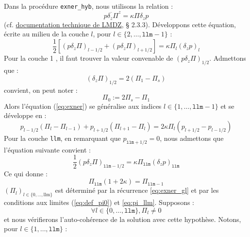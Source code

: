 \documentclass[a4paper,french]{article}
\begin{document}
Dans la procédure \verb+exner_hyb+, nous utilisons la relation :
\begin{displaymath}
  \overline{p \delta_z \Pi}^z = \kappa \Pi \delta_z p
\end{displaymath}
(cf. \href{http://lmdz.lmd.jussieu.fr/utilisateurs/manuel-de-reference-1/developpeurs/notes-techniques/ressources/documentation-du-modele-de-circulation-generale-atmospherique-lmdz}{documentation
  technique de LMDZ}, § 2.3.3). Développons cette équation, écrite au
milieu de la couche $l$, pour $l \in \{2, \dots, \mathtt{llm} - 1\}$ :
\begin{equation}
  \label{eq:exner}
  \frac{1}{2} [(p \delta_z \Pi)_{l-1/2} + (p \delta_z \Pi)_{l+1/2}]
  = \kappa \Pi_l (\delta_z p)_l
\end{equation}
Pour la couche 1 , il faut trouver la valeur convenable de $(p
\delta_z \Pi)_{1/2}$. Admettons que :
\begin{displaymath}
  (\delta_z \Pi)_{1/2} = 2 (\Pi_1 - \Pi_s)
\end{displaymath}
convient, on peut noter :
\begin{equation}
  \label{eq:def_pi0}
  \Pi_0 := 2 \Pi_s - \Pi_1
\end{equation}
Alors l'équation (\ref{eq:exner}) se généralise aux indices $l \in
\{1, \dots, \mathtt{llm} - 1\}$ et se développe en :
\begin{equation}
  \label{eq:exner_gl}
  p_{l-1/2} (\Pi_l - \Pi_{l-1}) + p_{l+1/2} (\Pi_{l+1} - \Pi_l)
  = 2 \kappa \Pi_l (p_{l+1/2} - p_{l-1/2})
\end{equation}
Pour la couche \verb+llm+, en remarquant que $p_{\mathtt{llm}+1/2} =
0$, nous admettons que l'équation suivante convient :
\begin{equation*}
  \frac{1}{2} (p \delta_z \Pi)_{\mathtt{llm}-1/2}
  = \kappa \Pi_\mathtt{llm} (\delta_z p)_\mathtt{llm}
\end{equation*}
Ce qui donne :
\begin{equation}
  \label{eq:pi_llm}
  \Pi_\mathtt{llm} (1 + 2 \kappa) = \Pi_{\mathtt{llm} - 1}
\end{equation}
$(\Pi_l)_{l \in \{0, \dots, \mathrm{llm}\}}$ est déterminé par la
récurrence \eqref{eq:exner_gl} et par les conditions aux limites
(\ref{eq:def_pi0}) et \eqref{eq:pi_llm}. Supposons :
\begin{equation}
  \label{eq:pi_pos}
  \forall l \in \{0, \dots, \mathtt{llm}\}, \Pi_l \ne 0
\end{equation}
et nous vérifierons l'auto-cohérence de la solution avec cette
hypothèse. Notons, pour $l \in \{1, \dots, \mathtt{llm}\}$ :
\end{document}
